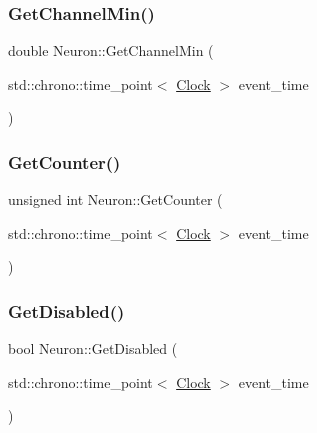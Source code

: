 \mbox{\label{classNeuron_a794c8fa270ea0600dab4fd13c25912fd}} 
\subsubsection{\texorpdfstring{Get\+Channel\+Min()}{GetChannelMin()}}
{\footnotesize\ttfamily double Neuron\+::\+Get\+Channel\+Min (\begin{DoxyParamCaption}\item[{std\+::chrono\+::time\+\_\+point$<$ \mbox{\hyperlink{universe_8h_a0ef8d951d1ca5ab3cfaf7ab4c7a6fd80}{Clock}} $>$}]{event\+\_\+time }\end{DoxyParamCaption})\hspace{0.3cm}{\ttfamily [inline]}}

\mbox{\label{classNeuron_a0b5fe55bf939808986b3697d18a834f4}} 
\subsubsection{\texorpdfstring{Get\+Counter()}{GetCounter()}}
{\footnotesize\ttfamily unsigned int Neuron\+::\+Get\+Counter (\begin{DoxyParamCaption}\item[{std\+::chrono\+::time\+\_\+point$<$ \mbox{\hyperlink{universe_8h_a0ef8d951d1ca5ab3cfaf7ab4c7a6fd80}{Clock}} $>$}]{event\+\_\+time }\end{DoxyParamCaption})\hspace{0.3cm}{\ttfamily [inline]}}

\mbox{\label{classNeuron_adfee1a62df820344b84fe2020451b24f}} 
\subsubsection{\texorpdfstring{Get\+Disabled()}{GetDisabled()}}
{\footnotesize\ttfamily bool Neuron\+::\+Get\+Disabled (\begin{DoxyParamCaption}\item[{std\+::chrono\+::time\+\_\+point$<$ \mbox{\hyperlink{universe_8h_a0ef8d951d1ca5ab3cfaf7ab4c7a6fd80}{Clock}} $>$}]{event\+\_\+time }\end{DoxyParamCaption})\hspace{0.3cm}{\ttfamily [inline]}}

